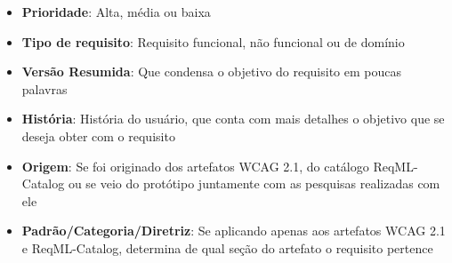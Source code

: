 \begin{itemize}
    \item \textbf{Prioridade}: Alta, média ou baixa
    \item \textbf{Tipo de requisito}: Requisito funcional, não funcional ou de domínio
    \item \textbf{Versão Resumida}: Que condensa o objetivo do requisito em poucas palavras
    \item \textbf{História}: História do usuário, que conta com mais detalhes o objetivo que se deseja obter com o requisito
    \item \textbf{Origem}: Se foi originado dos artefatos WCAG 2.1, do catálogo ReqML-Catalog ou se veio do protótipo juntamente com as pesquisas realizadas com ele 
    \item \textbf{Padrão/Categoria/Diretriz}: Se aplicando apenas aos artefatos WCAG 2.1 e ReqML-Catalog, determina de qual seção do artefato o requisito pertence 
\end{itemize}

